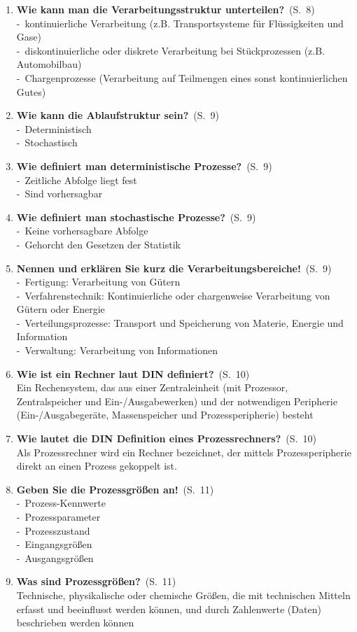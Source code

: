 \documentclass[a4paper,12pt]{article}
\newcommand{\question}[3]{\pagebreak[3]\item {\textbf{#1?}}\ (S.\ #2)#3}
\newcommand{\statement}[3]{\pagebreak[3]\item {\textbf{#1!}}\ (S.\ #2)#3}
\newcommand{\catchword}[1]{\\-\ #1}
\newcommand{\normaltext}[1]{\\#1}
\newcommand{\page}[1]{#1}
\begin{document}
\begin{enumerate}
  \question{Wie kann man die Verarbeitungsstruktur unterteilen}{\page{8}}
  {
    \catchword{kontinuierliche Verarbeitung (z.B. Transportsysteme für Flüssigkeiten und Gase)}
    \catchword{diskontinuierliche oder diskrete Verarbeitung bei Stückprozessen (z.B. Automobilbau)}
    \catchword{Chargenprozesse (Verarbeitung auf Teilmengen eines sonst kontinuierlichen Gutes)}
  }

  \question{Wie kann die Ablaufstruktur sein}{\page{9}}
  {
    \catchword{Deterministisch}
    \catchword{Stochastisch}
  }

  \question{Wie definiert man deterministische Prozesse}{\page{9}}
  {
    \catchword{Zeitliche Abfolge liegt fest}
    \catchword{Sind vorhersagbar}
  }

  \question{Wie definiert man stochastische Prozesse}{\page{9}}
  {
    \catchword{Keine vorhersagbare Abfolge}
    \catchword{Gehorcht den Gesetzen der Statistik}
  }

  \statement{Nennen und erklären Sie kurz die Verarbeitungsbereiche}{\page{9}}
  {
    \catchword{Fertigung: Verarbeitung von Gütern}
    \catchword{Verfahrenstechnik: Kontinuierliche oder chargenweise Verarbeitung
               von Gütern oder Energie}
    \catchword{Verteilungsprozesse: Transport und Speicherung von Materie, Energie und Information}
    \catchword{Verwaltung: Verarbeitung von Informationen}
  }

  \question{Wie ist ein Rechner laut DIN definiert}{\page{10}}
  {
    \normaltext{Ein Rechensystem, das aus einer Zentraleinheit (mit Prozessor, Zentralspeicher
                und Ein-/Ausgabewerken) und der notwendigen Peripherie (Ein-/Ausgabegeräte,
                Massenspeicher und Prozessperipherie) besteht}
  }

  \question{Wie lautet die DIN Definition eines Prozessrechners}{\page{10}}
  {
    \normaltext{Als Prozessrechner wird ein Rechner bezeichnet, der mittels Prozessperipherie direkt
                an einen Prozess gekoppelt ist.}
  }

  \statement{Geben Sie die Prozessgrößen an}{\page{11}}
  {
    \catchword{Prozess-Kennwerte}
    \catchword{Prozessparameter}
    \catchword{Prozesszustand}
    \catchword{Eingangsgrößen}
    \catchword{Ausgangsgrößen}
  }

  \question{Was sind Prozessgrößen}{\page{11}}
  {
    \normaltext{Technische, physikalische oder chemische Größen, die mit technischen Mitteln
                erfasst und beeinflusst werden können, und durch Zahlenwerte (Daten) beschrieben
                werden können}
  }


\end{enumerate}
\end{document}

